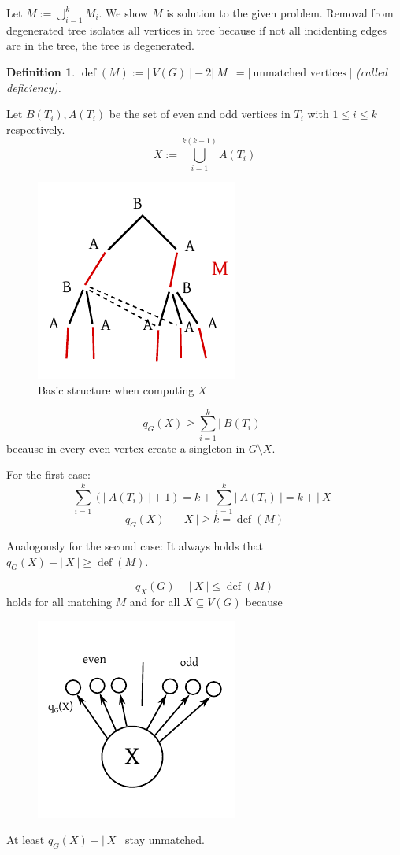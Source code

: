 \documentclass{article}
\newtheorem*{definition}{Definition}
\newcommand{\card}[1]{\left|\:\!#1\:\!\right|}
\DeclareMathOperator{\deficiency}{def}
\begin{document}
Let $M := \bigcup_{i=1}^k M_i$. We show $M$ is solution to the given problem.
Removal from degenerated tree isolates all vertices in tree because if not all incidenting edges are in the tree, the tree is degenerated.

\begin{definition}
$\deficiency(M) := \card{V(G)} - 2\card{M} = \card{\text{unmatched vertices}}$ (called \emph{deficiency}).
\end{definition}
Let $B(T_i), A(T_i)$ be the set of even and odd vertices in ${T_i}$ with $1 \leq i \leq k$ respectively.
\[
  X := \bigcup_{i=1}^{k(k-1)} A(T_i)
\]
\begin{figure}[!ht]
  \begin{center}
    \includegraphics{img/perfect_matching_set_X.pdf}
    \caption{Basic structure when computing $X$}
  \end{center}
\end{figure}
\[
  q_G(X) \geq \sum_{i=1}^k \card{B(T_i)}
\]
because in every even vertex create a singleton in $G \setminus X$.

For the first case:
\[
  \sum_{i=1}^k \left(\card{A(T_i)} + 1\right) = k + \sum_{i=1}^k \card{A(T_i)} = k + \card{X}
\] \[
  q_G(X) - \card{X} \geq k = \deficiency(M)
\]

Analogously for the second case:
It always holds that $q_G(X) - \card{X} \geq \deficiency(M)$.

\[
  q_X(G) - \card{X} \leq \deficiency(M)
\]
holds for all matching $M$ and for all $X \subseteq V(G)$ because
\begin{figure}[!ht]
  \begin{center}
    \includegraphics{img/perfect_matching_because.pdf}
  \end{center}
\end{figure}
At least $q_G(X) - \card{X}$ stay unmatched.
\end{document}
